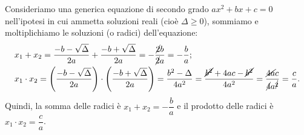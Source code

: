 Consideriamo una generica equazione di secondo grado $a x^{2} + b x + c = 0$ nell'ipotesi in cui ammetta soluzioni reali (cioè $\Delta \geq 0$), sommiamo e moltiplichiamo le soluzioni (o radici) dell'equazione:
\begin{align*}
& x_{1} + x_{2} = \frac{- b - \sqrt{\Delta}}{2 a} + \frac{- b + \sqrt{\Delta}}{2 a} = - \frac{\cancel{2} b}{\cancel{2} a}=- \frac{b}{a};\\
& x_{1} \cdot x_{2}=\left( \frac{- b - \sqrt{\Delta}}{2 a} \right) \cdot \left( \frac{- b + \sqrt{\Delta}}{2 a} \right)= \frac{b^{2} - \Delta}{4 a^2}=\frac{\cancel{b^{2}} + 4 a c - \cancel{b^{2}}}{4 a^{2}} =\frac{\cancel{4 a} c}{\cancel{4} a^{\cancel{2}}}=\frac{c}{a}.
\end{align*}
Quindi, la somma delle radici è $x_{1} + x_{2}=- \dfrac{b}{a}$ e il prodotto delle radici è $x_{1} \cdot x_{2}=\dfrac{c}{a}$.

